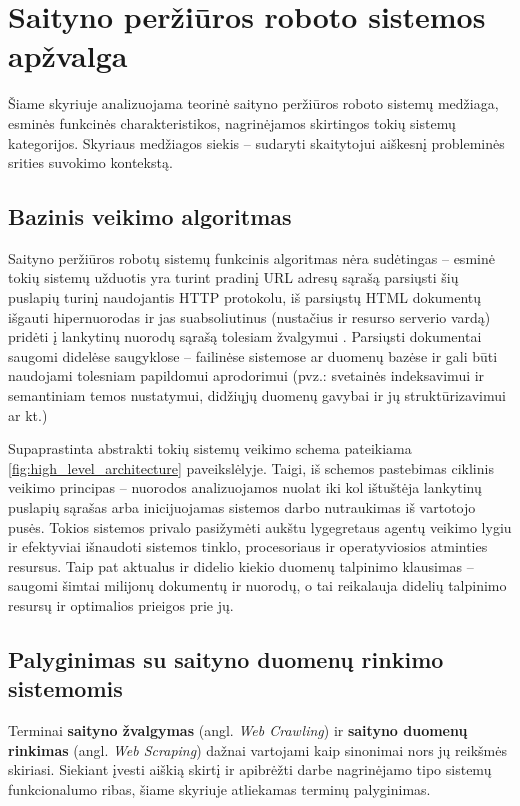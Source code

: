 \section{Saityno peržiūros roboto sistemos apžvalga}

Šiame skyriuje analizuojama teorinė saityno peržiūros roboto sistemų medžiaga, esminės funkcinės charakteristikos, nagrinėjamos skirtingos tokių sistemų kategorijos. Skyriaus medžiagos siekis -- sudaryti skaitytojui aiškesnį probleminės srities suvokimo kontekstą.

\subsection{Bazinis veikimo algoritmas}

Saityno peržiūros robotų sistemų funkcinis algoritmas nėra sudėtingas -- esminė tokių sistemų užduotis yra turint pradinį URL adresų sąrašą parsiųsti šių puslapių turinį naudojantis HTTP protokolu, iš parsiųstų HTML dokumentų išgauti hipernuorodas ir jas suabsoliutinus (nustačius ir resurso serverio vardą) pridėti į lankytinų nuorodų sąrašą tolesiam žvalgymui \cite{StanfWebCrawl}. Parsiųsti dokumentai saugomi didelėse saugyklose -- failinėse sistemose ar duomenų bazėse ir gali būti naudojami tolesniam papildomui aprodorimui (pvz.: svetainės indeksavimui ir semantiniam temos nustatymui, didžiųjų duomenų gavybai ir jų struktūrizavimui ar kt.)


Supaprastinta abstrakti tokių sistemų veikimo schema pateikiama \ref{fig:high_level_architecture} paveikslėlyje. Taigi, iš schemos pastebimas ciklinis veikimo principas -- nuorodos analizuojamos nuolat iki kol ištuštėja lankytinų puslapių sąrašas arba inicijuojamas sistemos darbo nutraukimas iš vartotojo pusės. Tokios sistemos privalo pasižymėti aukštu lygegretaus agentų veikimo lygiu ir efektyviai išnaudoti sistemos tinklo, procesoriaus ir operatyviosios atminties resursus. Taip pat aktualus ir didelio kiekio duomenų talpinimo klausimas -- saugomi šimtai milijonų dokumentų ir nuorodų, o tai reikalauja didelių talpinimo resursų ir optimalios prieigos prie jų.

\pagebreak
\subsection{Palyginimas su saityno duomenų rinkimo sistemomis}
Terminai \textbf{saityno žvalgymas} (angl. \textit{Web Crawling}) ir \textbf{saityno duomenų rinkimas} (angl. \textit{Web Scraping}) dažnai vartojami kaip sinonimai nors jų reikšmės skiriasi. Siekiant įvesti aiškią skirtį ir apibrėžti darbe nagrinėjamo tipo sistemų funkcionalumo ribas, šiame skyriuje atliekamas terminų palyginimas. 

